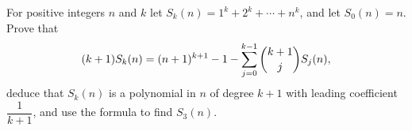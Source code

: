 For positive integers $n$ and $k$ let $S_k(n)=1^k+2^k+\cdots+n^k$, and let $S_0(n)=n$. Prove that
\[(k+1)S_k(n)=(n+1)^{k+1}-1-\sum_{j=0}^{k-1}\dbinom{k+1}{j}S_j(n),\]
deduce that $S_k(n)$ is a polynomial in $n$ of degree $k+1$ with leading coefficient $\dfrac1{k+1}$, and use the formula to find $S_3(n)$.
